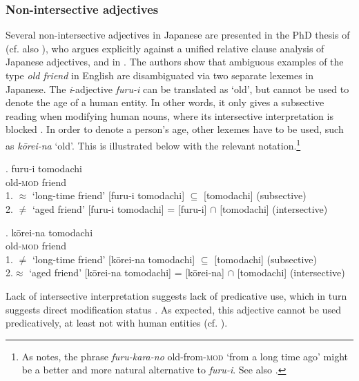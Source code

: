 \subsubsection{Non-intersective adjectives}

Several non-intersective adjectives in Japanese are presented in the PhD thesis of \citet{yamakido:2005:nature} (cf. also \citealt{yamakido:2000:japanese, yamakido:2007:nature}), who argues explicitly against a unified relative clause analysis of Japanese adjectives, and in \citet{ayano:2010:revisiting}. The authors show that ambiguous examples of the type \textit{old friend} in English are disambiguated via two separate lexemes in Japanese. The \textit{i}-adjective \textit{furu-i} can be translated as `old’, but cannot be used to denote the age of a human entity. In other words, it only gives a subsective reading when modifying human nouns, where its intersective interpretation is blocked \citep[66–67]{yamakido:2005:nature}. In order to denote a person's age, other lexemes have to be used, such as \textit{kōrei-na} `old’. This is illustrated below with the relevant notation.\footnote{As \citet[511, Footnote 7]{watanabe:2012:direct} notes, the phrase \textit{furu-kara-no} old-from-\textsc{mod} `from a long time ago' might be a better and more natural alternative to \textit{furu-i}. See also \citet[155–156]{tatsuki:2009:nihongo}.}

\exg. furu-i tomodachi\\
old-\textsc{mod} friend \null \hfill \citep[81]{yamakido:2005:nature}\\
1. $\approx$ `long-time friend’ [furu-i tomodachi] $\subseteq$ [tomodachi] (subsective)\\
2. $\neq$ `aged friend’ [furu-i tomodachi] = [furu-i] $\cap$ [tomodachi] (intersective)

\exg. kōrei-na tomodachi\\
old-\textsc{mod} friend \null \hfill \citep[67]{yamakido:2005:nature}\\
1. $\neq$ `long-time friend’ [kōrei-na tomodachi] $\subseteq$ [tomodachi] (subsective)\\
2.$\approx$ `aged friend’ [kōrei-na tomodachi] = [kōrei-na] $\cap$ [tomodachi] (intersective)

Lack of intersective interpretation suggests lack of predicative use, which in turn suggests direct modification status \citep{larson:1998:events, cinque:2010:adj}. As expected, this adjective cannot be used predicatively, at least not with human entities (cf. \citealt[67]{yamakido:2005:nature}).

